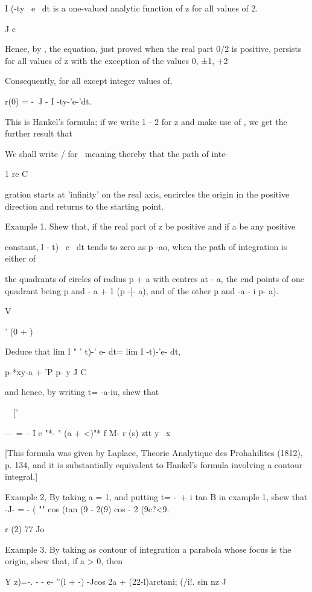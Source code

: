 I (-ty~ e~ dt is a one-valued analytic function of z for all values of
2.

J c

Hence, by , the equation, just proved when the real part 0/2 is
positive, persists for all values of z with the exception of the
values 0, ±1, +2

Consequently, for all except integer values of,

r(0) = -\ J - I -ty-'e-'dt.

This is Hankel's formula; if we write 1 - 2 for z and make use of
, we get the further result that

We shall write / for \, meaning thereby that the path of inte-

1 re C

gration starts at 'infinity' on the real axis, encircles the origin in
the positive direction and returns to the starting point.

Example 1. Shew that, if the real part of z be positive and if a be
any positive

constant, l - t)~ e~ dt tends to zero as p -ao, when the path of
integration is either of

the quadrants of circles of radius p + a with centres at - a, the end
points of one quadrant being p and - a + 1 (p -|- a), and of the other
p and -a - i p- a).

V

' (0 + )

%
%

Deduce that lim I " ' t)-' e- dt= lim I -t)-'e- dt,

p-*xy-a + 'P p- y J C

and hence, by writing t= -a-iu, shew that

\ \ ['

--- = -- I e "*- " (a + <)"* f M- r (s) ztt y \ x

[This formula was given by Laplace, Theorie Analytique des
Prohahilites (1812), p. 134, and it is substantially equivalent to
Hankel's formula involving a contour integral.]

Example 2, By taking a = 1, and putting t= -\ + i tan B in example 1,
shew that -J- = - ( "" cos (tan (9 - 2(9) cos - 2 (9c?<9.

r (2) 77 Jo

Example 3. By taking as contour of integration a parabola whose focus
is the origin, shew that, if a > 0, then

Y z)=-. - - e- ''(l + -) -Jcos 2a + (22-l)arctani; (/i!. sin nz J

